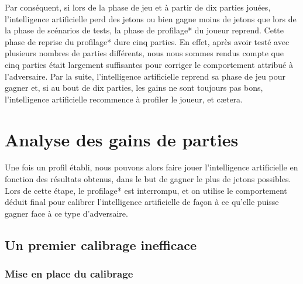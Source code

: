 \documentclass{report}
\begin{document}
Par conséquent, si lors de la phase de jeu et à partir de dix parties jouées, l'intelligence artificielle perd des jetons ou bien gagne moins de jetons que lors de la phase de scénarios de tests, la phase de profilage* du joueur reprend. Cette phase de reprise du profilage* dure cinq parties. En effet, après avoir testé avec plusieurs nombres de parties différents, nous nous sommes rendus compte que cinq parties était largement suffisantes pour corriger le comportement attribué à l'adversaire. Par la suite, l'intelligence artificielle reprend sa phase de jeu pour gagner et, si au bout de dix parties, les gains ne sont toujours pas bons, l'intelligence artificielle recommence à profiler le joueur, et cætera.\\

\chapter{Analyse des gains de parties}

\hspace{0.5cm}Une fois un profil établi, nous pouvons alors faire jouer l'intelligence artificielle en fonction des résultats obtenus, dans le but de gagner le plus de jetons possibles. Lors de cette étape, le profilage* est interrompu, et on utilise le comportement déduit final pour calibrer l'intelligence artificielle de façon à ce qu'elle puisse gagner face à ce type d'adversaire.\par

\section{Un premier calibrage inefficace}

\subsection{Mise en place du calibrage}
\end{document}
